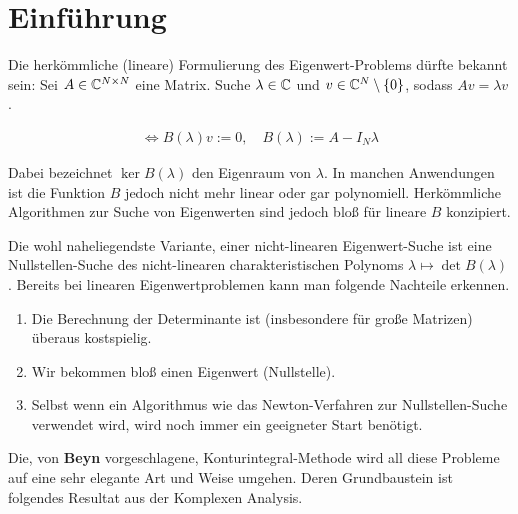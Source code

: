 \section{Einführung}

Die herkömmliche (lineare) Formulierung des Eigenwert-Problems dürfte bekannt sein:
Sei $A \in \mathbb{C}^{N \times N}$ eine Matrix.
Suche $\lambda \in \mathbb{C}$ und $v \in \mathbb{C}^N \setminus {\left \{ 0 \right \}}$, sodass $A v = \lambda v$.

\begin{align*}
    \iff
    B(\lambda) v := 0,
    \quad
    B(\lambda) := A - I_N \lambda
\end{align*}

Dabei bezeichnet $\ker B(\lambda)$ den Eigenraum von $\lambda$.
In manchen Anwendungen ist die Funktion $B$ jedoch nicht mehr linear oder gar polynomiell.
Herkömmliche Algorithmen zur Suche von Eigenwerten sind jedoch bloß für lineare $B$ konzipiert.

Die wohl naheliegendste Variante, einer nicht-linearen Eigenwert-Suche ist eine Nullstellen-Suche des nicht-linearen charakteristischen Polynoms $\lambda \mapsto \det B(\lambda)$.
Bereits bei linearen Eigenwertproblemen kann man folgende Nachteile erkennen.

\begin{enumerate}[label = \arabic*.]
    \item Die Berechnung der Determinante ist (insbesondere für große Matrizen) überaus kostspielig.
    \item Wir bekommen bloß einen Eigenwert (Nullstelle).
    \item Selbst wenn ein Algorithmus wie das Newton-Verfahren zur Nullstellen-Suche verwendet wird, wird noch immer ein geeigneter Start benötigt.
\end{enumerate}

Die, von \textbf{Beyn} vorgeschlagene, Konturintegral-Methode wird all diese Probleme auf eine sehr elegante Art und Weise umgehen.
Deren Grundbaustein ist folgendes Resultat aus der Komplexen Analysis.